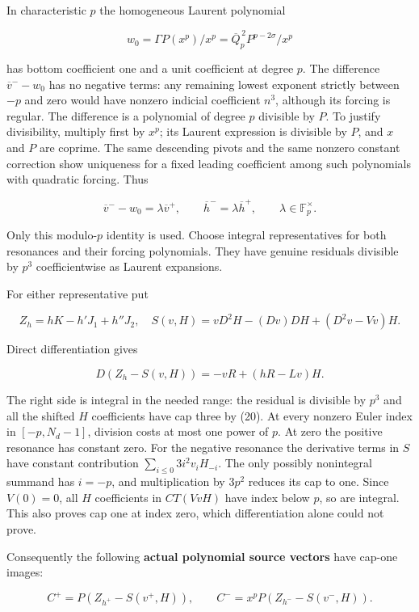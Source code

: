 \documentclass[11pt,a4paper]{article}
\begin{document}
In characteristic \(p\) the homogeneous Laurent polynomial

\[
w_0=\Gamma P(x^p)/x^p
=\overline Q_p^{\,2}P^{p-2\sigma}/x^p
\]

has bottom coefficient one and a unit coefficient at degree \(p\). The difference \(\overline{v}^{-}-w_{0}\) has no negative terms: any remaining lowest exponent strictly between \(-p\) and zero would have nonzero indicial coefficient \(n^{3}\), although its forcing is regular. The difference is a polynomial of degree \(p\) divisible by \(P\). To justify divisibility, multiply first by \(x^p\); its Laurent expression is divisible by \(P\), and \(x\) and \(P\) are coprime. The same descending pivots and the same nonzero constant correction show uniqueness for a fixed leading coefficient among such polynomials with quadratic forcing. Thus

\[
\overline v^- -w_0=\lambda\overline v^+,
\qquad \overline h^- =\lambda\overline h^+,
\qquad\lambda\in\mathbb F_p^\times.\tag{29}
\]

Only this modulo-\(p\) identity is used. Choose integral representatives for both resonances and their forcing polynomials. They have genuine residuals divisible by \(p^{3}\) coefficientwise as Laurent expansions.

For either representative put

\[
Z_h=hK-h'J_1+h''J_2,
\quad S(v,H)=vD^2H-(Dv)DH+(D^2v-Vv)H.
\]

Direct differentiation gives

\[
D(Z_h-S(v,H))=-vR+(hR-Lv)H.\tag{30}
\]

The right side is integral in the needed range: the residual is divisible by \(p^{3}\) and all the shifted \(H\) coefficients have cap three by (20). At every nonzero Euler index in \([-p,N_d-1]\), division costs at most one power of \(p\). At zero the positive resonance has constant zero. For the negative resonance the derivative terms in \(S\) have constant contribution \(\sum _{i≤0}3i^{2}v_iH_{-i}\). The only possibly nonintegral summand has \(i=-p\), and multiplication by \(3p^{2}\) reduces its cap to one. Since \(V(0)=0\), all \(H\) coefficients in \(CT(VvH)\) have index below \(p\), so are integral. This also proves cap one at index zero, which differentiation alone could not prove.

Consequently the following \textbf{actual polynomial source vectors} have cap-one images:

\[
C^+=P(Z_{h^+}-S(v^+,H)),\qquad
C^-=x^pP(Z_{h^-}-S(v^-,H)).\tag{31}
\]
\end{document}
